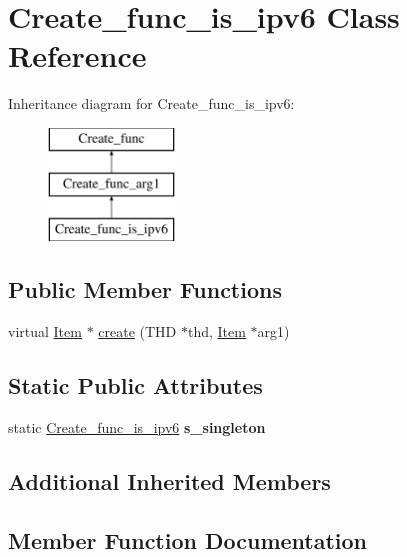 \hypertarget{classCreate__func__is__ipv6}{}\section{Create\+\_\+func\+\_\+is\+\_\+ipv6 Class Reference}
\label{classCreate__func__is__ipv6}
Inheritance diagram for Create\+\_\+func\+\_\+is\+\_\+ipv6\+:\begin{figure}[H]
\begin{center}
\leavevmode
\includegraphics[height=3.000000cm]{classCreate__func__is__ipv6}
\end{center}
\end{figure}
\subsection*{Public Member Functions}
\begin{DoxyCompactItemize}
\item 
virtual \mbox{\hyperlink{classItem}{Item}} $\ast$ \mbox{\hyperlink{classCreate__func__is__ipv6_a531564e2c5c2613803de8e28074289c1}{create}} (T\+HD $\ast$thd, \mbox{\hyperlink{classItem}{Item}} $\ast$arg1)
\end{DoxyCompactItemize}
\subsection*{Static Public Attributes}
\begin{DoxyCompactItemize}
\item 
\mbox{\label{classCreate__func__is__ipv6_a3e0909602739bbc0605e13aff2e5a157}} 
static \mbox{\hyperlink{classCreate__func__is__ipv6}{Create\+\_\+func\+\_\+is\+\_\+ipv6}} {\bfseries s\+\_\+singleton}
\end{DoxyCompactItemize}
\subsection*{Additional Inherited Members}


\subsection{Member Function Documentation}
\mbox{\label{classCreate__func__is__ipv6_a531564e2c5c2613803de8e28074289c1}} 
